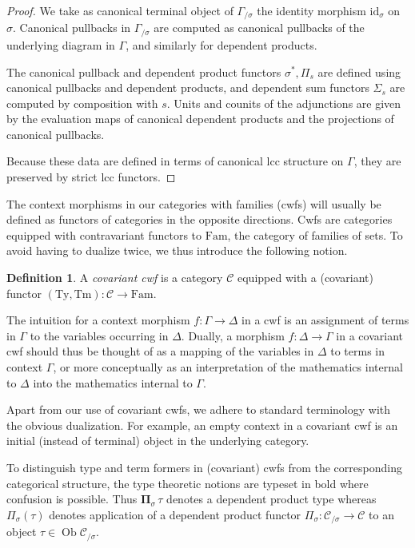 \documentclass[a4paper]{article}
\theoremstyle{remark}
\theoremstyle{definition}
\newtheorem{definition}[theorem]{Definition}
\begin{document}
\begin{proof}
  We take as canonical terminal object of $\Gamma_{/ \sigma}$ the identity morphism $\mathrm{id}_\sigma$ on $\sigma$.
  Canonical pullbacks in $\Gamma_{/ \sigma}$ are computed as canonical pullbacks of the underlying diagram in $\Gamma$, and similarly for dependent products. 
  
  The canonical pullback and dependent product functors $\sigma^*, \Pi_s$ are defined using canonical pullbacks and dependent products, and dependent sum functors $\Sigma_s$ are computed by composition with $s$.
  Units and counits of the adjunctions are given by the evaluation maps of canonical dependent products and the projections of canonical pullbacks.

  Because these data are defined in terms of canonical lcc structure on $\Gamma$, they are preserved by strict lcc functors.
\end{proof}

The context morphisms in our categories with families (cwfs) \citep{internal-type-theory} will usually be defined as functors of categories in the opposite directions.
Cwfs are categories equipped with contravariant functors to $\mathrm{Fam}$, the category of families of sets.
To avoid having to dualize twice, we thus introduce the following notion.
\begin{definition}
  A \emph{covariant cwf} is a category $\mathcal{C}$ equipped with a (covariant) functor $(\mathrm{Ty}, \mathrm{Tm}) : \mathcal{C} \rightarrow \mathrm{Fam}$.
\end{definition}
The intuition for a context morphism $f : \Gamma \rightarrow \Delta$ in a cwf is an assignment of terms in $\Gamma$ to the variables occurring in $\Delta$.
Dually, a morphism $f : \Delta \rightarrow \Gamma$ in a covariant cwf should thus be thought of as a mapping of the variables in $\Delta$ to terms in context $\Gamma$, or more conceptually as an interpretation of the mathematics internal to $\Delta$ into the mathematics internal to $\Gamma$.

Apart from our use of covariant cwfs, we adhere to standard terminology with the obvious dualization.
For example, an empty context in a covariant cwf is an initial (instead of terminal) object in the underlying category.

To distinguish type and term formers in (covariant) cwfs from the corresponding categorical structure, the type theoretic notions are typeset in bold where confusion is possible.
Thus $\mathbf{\Pi}_\sigma \, \tau$ denotes a dependent product type whereas $\Pi_\sigma(\tau)$ denotes application of a dependent product functor $\Pi_\sigma : \mathcal{C}_{/ \sigma} \rightarrow \mathcal{C}$ to an object $\tau \in \operatorname{Ob} \mathcal{C}_{/ \sigma}$.
\end{document}
